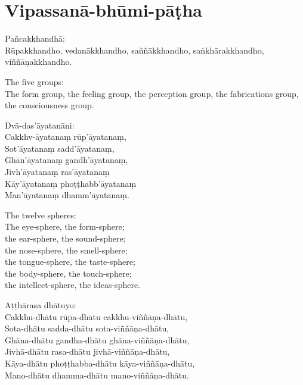 
\clearpage

\section{Vipassanā-bhūmi-pāṭha}



Pañcakkhandhā:\\
Rūpakkhandho, vedanākkhandho, saññākkhandho, saṅkhārakkhandho, viññāṇakkhandho.

\begin{english}
  The five groups:\\
  The form group, the feeling group, the perception group, the fabrications
  group, the consciousness group.
\end{english}

Dvā-das'āyatanāni:\\
Cakkhv-āyatanaṃ rūp'āyatanaṃ,\\
Sot'āyatanaṃ sadd'āyatanaṃ,\\
Ghān'āyatanaṃ gandh'āyatanaṃ,\\
Jivh'āyatanaṃ ras'āyatanaṃ\\
Kāy'āyatanaṃ phoṭṭhabb'āyatanaṃ\\
Man'āyatanaṃ dhamm'āyatanaṃ.

\begin{english}
  The twelve spheres:\\
  The eye-sphere, the form-sphere;\\
  the ear-sphere, the sound-sphere;\\
  the nose-sphere, the smell-sphere;\\
  the tongue-sphere, the taste-sphere;\\
  the body-sphere, the touch-sphere;\\
  the intellect-sphere, the ideas-sphere.
\end{english}

Aṭṭhārasa dhātuyo:\\
Cakkhu-dhātu rūpa-dhātu cakkhu-viññāṇa-dhātu,\\
Sota-dhātu sadda-dhātu sota-viññāṇa-dhātu,\\
Ghāna-dhātu gandha-dhātu ghāna-viññāṇa-dhātu,\\
Jivhā-dhātu rasa-dhātu jivhā-viññāṇa-dhātu,\\
Kāya-dhātu phoṭṭhabba-dhātu kāya-viññāṇa-dhātu,\\
Mano-dhātu dhamma-dhātu mano-viññāṇa-dhātu.

